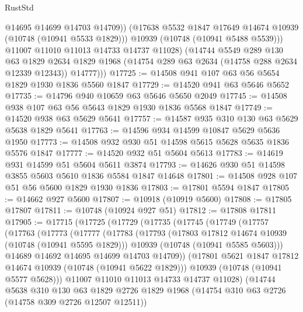 \begin{lexlean}{RustStd}
\begin{coremodule}
{\begin{coremodule}
{{{{{                @14695
                @14699
                @14703
                @14709))
            (@17638 @5532 @1847 @17649 @14674 @10939 (@10748 (@10941 @5533 @1829)))
            @10939
            (@10748 (@10941 @5488 @5539)))
          @11007
          @11010
          @11013
          @14733
          @14737
          @11028)
        (@14744
          @5549
          @289
          @130
          @63
          @1829
          @2634
          @1829
          @1968
          (@14754 @289 @63 @2634 (@14758 @288 @2634 @12339 @12343))
          @14777)))
@17725 := @14508 @941 @107 @63 @56 @5654 @1829 @1930 @1836 @5560 @1847
@17729 := @14520 @941 @63 @5646 @5652
@17735 := @14796 @940 @10659 @63 @5646 @5650 @2049
@17745 := @14508 @938 @107 @63 @56 @5643 @1829 @1930 @1836 @5568 @1847
@17749 := @14520 @938 @63 @5629 @5641
@17757 := @14587 @935 @310 @130 @63 @5629 @5638 @1829 @5641
@17763 := @14596 @934 @14599 @10847 @5629 @5636 @1950
@17773 := @14508 @932 @930 @51 @14598 @5615 @5628 @5635 @1836 @5576 @1847
@17777 := @14520 @932 @51 @5604 @5613
@17783 := @14619 @931 @14599 @51 @5604 @5611 @3874
@17793 := @14626 @930 @51 @14598 @3855 @5603 @5610 @1836 @5584 @1847 @14648
@17801 := @14508 @928 @107 @51 @56 @5600 @1829 @1930 @1836
@17803 := @17801 @5594 @1847
@17805 := @14662 @927 @5600
@17807 := @10918 (@10919 @5600)
@17808 := @17805 @17807
@17811 := @10748 (@10924 @927 @51)
@17812 := @17808 @17811
@17905 := @17715
    (@17725
      (@17729
        (@17735
          (@17745
            (@17749
              (@17757
                (@17763
                  (@17773
                    (@17777
                      (@17783
                        (@17793
                          (@17803 @17812 @14674 @10939 (@10748 (@10941 @5595 @1829)))
                          @10939
                          (@10748 (@10941 @5585 @5603)))
                        @14689
                        @14692
                        @14695
                        @14699
                        @14703
                        @14709))
                    (@17801 @5621 @1847 @17812 @14674 @10939 (@10748 (@10941 @5622 @1829)))
                    @10939
                    (@10748 (@10941 @5577 @5628)))
                  @11007
                  @11010
                  @11013
                  @14733
                  @14737
                  @11028)
                (@14744
                  @5638
                  @310
                  @130
                  @63
                  @1829
                  @2726
                  @1829
                  @1968
                  (@14754 @310 @63 @2726 (@14758 @309 @2726 @12507 @12511))
}}}}}
\end{coremodule}}
\end{coremodule}
\end{lexlean}
